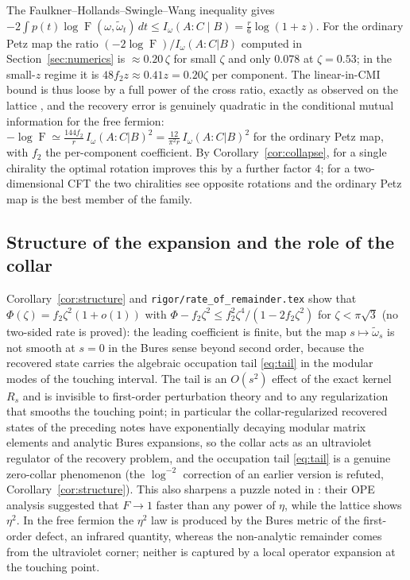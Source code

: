 \documentclass[11pt]{article}
\theoremstyle{accent}
\theoremstyle{definition}
\newcommand{\Fid}{\operatorname{F}}
\begin{document}
The Faulkner--Hollands--Swingle--Wang inequality gives \(-2\int p(t)\log\Fid(\omega,\widetilde\omega_t)\,dt\le I_\omega(A:C\mid B)=\frac r6\log(1+z)\).  For the ordinary Petz map the ratio \((-2\log\Fid)/I_\omega(A{:}C|B)\) computed in Section~\ref{sec:numerics} is \(\approx0.20\,\zeta\) for small \(\zeta\) and only \(0.078\) at \(\zeta=0.53\); in the small-\(z\) regime it is \(48f_2z\approx0.41z=0.20\zeta\) per component.  The linear-in-CMI bound is thus loose by a full power of the cross ratio, exactly as observed on the lattice \cite{VardhanWeiZou}, and the recovery error is genuinely quadratic in the conditional mutual information for the free fermion: \(-\log\Fid\simeq\frac{144f_2}{r}\,I_\omega(A{:}C|B)^2=\frac{12}{\pi^2r}\,I_\omega(A{:}C|B)^2\) for the ordinary Petz map, with \(f_2\) the per-component coefficient.  By Corollary~\ref{cor:collapse}, for a single chirality the optimal rotation improves this by a further factor \(4\); for a two-dimensional CFT the two chiralities see opposite rotations and the ordinary Petz map is the best member of the family.

\subsection{Structure of the expansion and the role of the collar}

Corollary~\ref{cor:structure} and \texttt{rigor/rate\_of\_remainder.tex} show that \(\Phi(\zeta)=f_2\zeta^2(1+o(1))\) with \(\Phi-f_2\zeta^2\le f_2^2\zeta^4/(1-2f_2\zeta^2)\) for \(\zeta<\pi\sqrt3\) (no two-sided rate is proved): the leading coefficient is finite, but the map \(s\mapsto\widetilde\omega_s\) is not smooth at \(s=0\) in the Bures sense beyond second order, because the recovered state carries the algebraic occupation tail \eqref{eq:tail} in the modular modes of the touching interval.  The tail is an \(O(s^2)\) effect of the exact kernel \(R_s\) and is invisible to first-order perturbation theory and to any regularization that smooths the touching point; in particular the collar-regularized recovered states of the preceding notes have exponentially decaying modular matrix elements and analytic Bures expansions, so the collar acts as an ultraviolet regulator of the recovery problem, and the occupation tail \eqref{eq:tail} is a genuine zero-collar phenomenon (the \(\log^{-2}\) correction of an earlier version is refuted, Corollary~\ref{cor:structure}).  This also sharpens a puzzle noted in \cite{VardhanWeiZou}: their OPE analysis suggested that \(F\to1\) faster than any power of \(\eta\), while the lattice shows \(\eta^2\).  In the free fermion the \(\eta^2\) law is produced by the Bures metric of the first-order defect, an infrared quantity, whereas the non-analytic remainder comes from the ultraviolet corner; neither is captured by a local operator expansion at the touching point.
\end{document}
